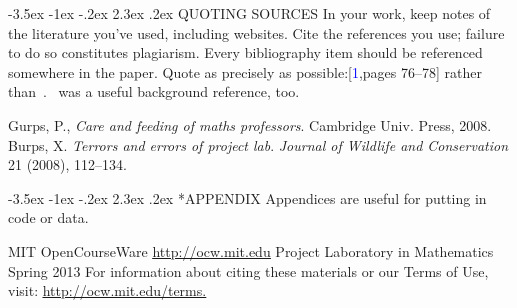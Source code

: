 \documentclass{article}
\makeatletter
\renewcommand\section{\@startsection {section}{1}{\z@}%
	{-3.5ex \@plus -1ex \@minus -.2ex}%
	{2.3ex \@plus.2ex}%
	{\normalfont\Large}}
\makeatother
\begin{document}
\section{QUOTING SOURCES}
In your work, keep notes of the literature you’ve used, including websites. Cite the references you use; failure to do so constitutes plagiarism. Every bibliography item should be referenced somewhere in the paper. Quote as precisely as possible:[\textcolor{blue}{1},pages 76--78] rather than~\cite{itref}.~\cite{itref2} was a useful background reference, too.

\begingroup \renewcommand{\refname}{REFERENCES}
\begin{thebibliography}{9}
	Gurps, P., \emph{Care and feeding of maths professors}. Cambridge Univ. Press, 2008.
	Burps, X. \emph{Terrors and errors of project lab}. \emph{Journal of Wildlife and Conservation} 21 (2008), 112--134.
\end{thebibliography}
\endgroup
\appendix

\section*{APPENDIX}
Appendices are useful for putting in code or data.
\newpage
\raggedright
MIT OpenCourseWare 
\newline
\href{http://ocw.mit.edu}{\underline {http://ocw.mit.edu}}
\vspace{2 cm}
 Project Laboratory in Mathematics \\
Spring 2013 
\vspace{2 cm}
\newline
For information about citing these materials or our Terms of Use, visit:
\href{http://ocw.mit.edu/terms}{\underline {http://ocw.mit.edu/terms.}}
\end{document}
